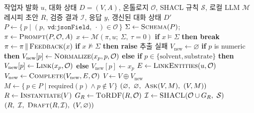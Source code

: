 \documentclass[11pt]{article}
\newcommand{\Fn}[1]{\textsc{#1}}
\begin{document}
\begin{algorithm}[t]
\caption{온톨로지 기반 로컬 LLM 공정 레시피 생성}
\label{alg:recipe-generation}
\begin{algorithmic}[1]
\Require 작업자 발화 $u$, 대화 상태 $D=(V, A)$, 온톨로지 $\mathcal{O}$, SHACL 규칙 $\mathcal{S}$, 로컬 LLM $\mathcal{M}$
\Ensure 레시피 초안 $R$, 검증 결과 $\mathcal{I}$, 응답 $y$, 갱신된 대화 상태 $D'$
\State $P \gets \{\, p \mid (p,\ \texttt{vd:jsonField},\ \cdot) \in \mathcal{O} \,\}$ 
\State $\Sigma \gets \Fn{Schema}(P)$;\ \ $\pi \gets \Fn{Prompt}(P, \mathcal{O}, A)$ 
    \State $x \gets \mathcal{M}(\pi, u;\ \Sigma,\ \tau = 0)$ 
    \State \textbf{if} $x \models \Sigma$ \textbf{then break}
    \State $\pi \gets \pi \,\Vert\, \Fn{Feedback}(x)$ 
\EndFor
\State \textbf{if} $x \not\models \Sigma$ \textbf{then raise} 추출 실패
\State $V_{\mathrm{new}} \gets \varnothing$
    \State \textbf{if} $p$ is numeric \textbf{then} $V_{\mathrm{new}}[p] \gets \Fn{Normalize}(x_p, p, \mathcal{O})$ 
    \State \textbf{else if} $p \in \{\mathrm{solvent}, \mathrm{substrate}\}$ \textbf{then} $V_{\mathrm{new}}[p] \gets \Fn{Link}(x_p, \mathcal{O})$ 
    \State \textbf{else} $V_{\mathrm{new}}[p] \gets x_p$
\EndFor
\State $E \gets \Fn{LinkEntities}(u, \mathcal{O})$ 
\State $V_{\mathrm{new}} \gets \Fn{Complete}(V_{\mathrm{new}}, E, \mathcal{O})$ 
\State $V \gets V \oplus V_{\mathrm{new}}$ 
\State $M \gets \{\, p \in P \mid \mathrm{required}(p) \wedge p \notin V \,\}$
    \State \Return $(\varnothing,\ \varnothing,\ \Fn{Ask}(V, M),\ (V, M))$ 
\EndIf
\State $R \gets \Fn{Instantiate}(V)$ 
\State $G_R \gets \Fn{ToRDF}(R, \mathcal{O})$ 
\State $\mathcal{I} \gets \Fn{SHACL}(\mathcal{O} \cup G_R,\ \mathcal{S})$ 
\State \Return $(R,\ \mathcal{I},\ \Fn{Draft}(R, \mathcal{I}),\ (V, \varnothing))$
\end{algorithmic}
\end{algorithm}
\end{document}
